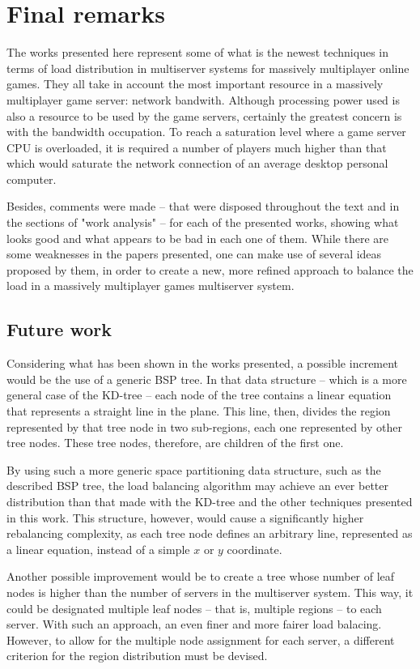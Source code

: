 \chapter{Final remarks}

The works presented here represent some of what is the newest techniques in terms of load distribution in multiserver systems for massively multiplayer online games. They all take in account the most important resource in a massively multiplayer game server: network bandwith. Although processing power used is also a resource to be used by the game servers, certainly the greatest concern is with the bandwidth occupation. To reach a saturation level where a game server CPU is overloaded, it is required a number of players much higher than that which would saturate the network connection of an average desktop personal computer.

Besides, comments were made -- that were disposed throughout the text and in the sections of "work analysis"{} -- for each of the presented works, showing what looks good and what appears to be bad in each one of them. While there are some weaknesses in the papers presented, one can make use of several ideas proposed by them, in order to create a new, more refined approach to balance the load in a massively multiplayer games multiserver system.


\section{Future work}

Considering what has been shown in the works presented, a possible increment would be the use of a generic BSP tree. In that data structure -- which is a more general case of the KD-tree -- each node of the tree contains a linear equation that represents a straight line in the plane. This line, then, divides the region represented by that tree node in two sub-regions, each one represented by other tree nodes. These tree nodes, therefore, are children of the first one.

By using such a more generic space partitioning data structure, such as the described BSP tree, the load balancing algorithm may achieve an ever better distribution than that made with the KD-tree and the other techniques presented in this work. This structure, however, would cause a significantly higher rebalancing complexity, as each tree node defines an arbitrary line, represented as a linear equation, instead of a simple $x$ or $y$ coordinate.

Another possible improvement would be to create a tree whose number of leaf nodes is higher than the number of servers in the multiserver system. This way, it could be designated multiple leaf nodes -- that is, multiple regions -- to each server. With such an approach, an even finer and more fairer load balacing. However, to allow for the multiple node assignment for each server, a different criterion for the region distribution must be devised.